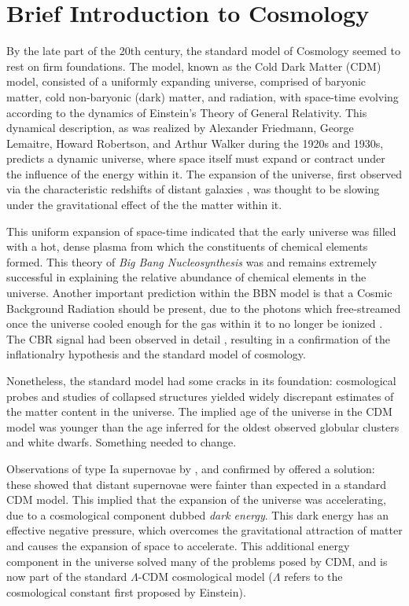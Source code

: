 \chapter{Brief Introduction to Cosmology}

By the late part of the 20th century, the standard model of Cosmology
seemed to rest on firm foundations.  The model, known as the Cold Dark Matter
(CDM) model, consisted of a uniformly
expanding universe, comprised of baryonic matter, cold
non-baryonic (dark) matter, and radiation, with space-time evolving
according to the dynamics of Einstein's Theory of General Relativity.
This dynamical description, as was realized by Alexander Friedmann,
George Lemaitre, Howard Robertson, and Arthur Walker during the
1920s and 1930s,
predicts a dynamic universe, where space itself must expand or contract
under the influence of the energy within it.  The expansion of the universe,
first observed via the characteristic redshifts of distant galaxies
\citep{hubble1929}, was thought to be slowing under the
gravitational effect of the the matter within it.

This uniform expansion of space-time indicated that the early universe
was filled with a hot, dense plasma from which the constituents of
chemical elements
formed.  This theory of {\it Big Bang Nucleosynthesis} \citep[BBN:][]{Alpher48}
was and remains extremely successful in explaining the relative
abundance of chemical elements in the universe.  Another important prediction
within the BBN model is that a Cosmic Background Radiation should be present,
due to the photons which free-streamed once the universe cooled enough for
the gas within it to no longer be ionized \citep{Alpher48b}.
The CBR signal had been observed in detail \citep{Smoot92},
resulting in a confirmation of the inflationalry
hypothesis and the standard model of cosmology.

Nonetheless, the standard model had some cracks in its foundation:
cosmological probes and
studies of collapsed structures yielded widely discrepant estimates of the
matter content in the universe.  The implied age of the universe in the CDM
model was younger than the age inferred for the oldest observed globular
clusters and white dwarfs.  Something needed to change.

Observations of type Ia supernovae by \citet{Riess98}, and confirmed by
\citet{Perlmutter99} offered a solution: these showed that distant supernovae
were fainter than expected in a standard CDM model.  This implied that the
expansion of the universe was accelerating, due to a cosmological component
dubbed {\it dark energy}.  This dark energy has an effective negative pressure,
which overcomes the gravitational attraction of matter and causes the
expansion of space to accelerate.  This additional energy component in the
universe solved many of the problems posed by CDM, and is now part of the
standard $\Lambda$-CDM cosmological model ($\Lambda$ refers to the cosmological
constant first proposed by Einstein).

